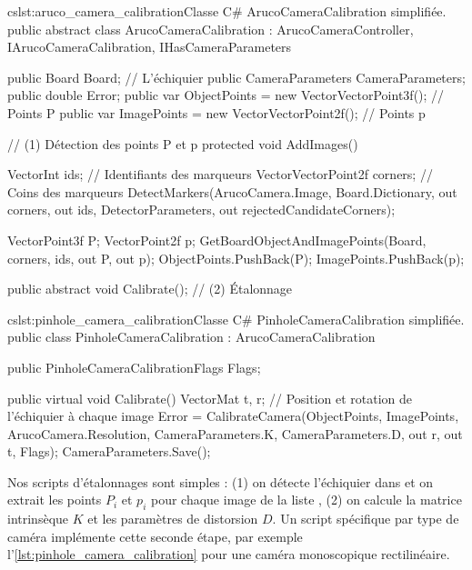 \begin{listingETS}{cs}{lst:aruco_camera_calibration}{Classe C\# ArucoCameraCalibration simplifiée.}
  public abstract class ArucoCameraCalibration : ArucoCameraController, IArucoCameraCalibration, IHasCameraParameters
  {
    public Board Board; // L'échiquier
    public CameraParameters CameraParameters;
    public double Error;
    public var ObjectPoints = new VectorVectorPoint3f(); // Points P
    public var ImagePoints = new VectorVectorPoint2f(); // Points p

    // (1) Détection des points P et p
    protected void AddImages()
    {
      VectorInt ids; // Identifiants des marqueurs
      VectorVectorPoint2f corners; // Coins des marqueurs
      DetectMarkers(ArucoCamera.Image, Board.Dictionary, out corners, out ids, DetectorParameters, out rejectedCandidateCorners);
      
      VectorPoint3f P;
      VectorPoint2f p;
      GetBoardObjectAndImagePoints(Board, corners, ids, out P, out p);
      ObjectPoints.PushBack(P);
      ImagePoints.PushBack(p);
    }

    public abstract void Calibrate(); // (2) Étalonnage
  }
\end{listingETS}

\begin{listingETS}{cs}{lst:pinhole_camera_calibration}{Classe C\# PinholeCameraCalibration simplifiée.}
  public class PinholeCameraCalibration : ArucoCameraCalibration
  {
    public PinholeCameraCalibrationFlags Flags;

    public virtual void Calibrate()
    {
      VectorMat t, r; // Position et rotation de l'échiquier à chaque image
      Error = CalibrateCamera(ObjectPoints, ImagePoints, ArucoCamera.Resolution, CameraParameters.K, CameraParameters.D, out r, out t, Flags);
      CameraParameters.Save();
    }
  }
\end{listingETS}

Nos scripts d'étalonnages sont simples : (1) on détecte l'échiquier dans et on extrait les points $P_i$ et $p_i$ pour chaque image de la liste , (2) on calcule la matrice intrinsèque $K$ et les paramètres de distorsion $D$. Un script spécifique par type de caméra implémente cette seconde étape, par exemple l'\autoref{lst:pinhole_camera_calibration} pour une caméra monoscopique rectilinéaire.

